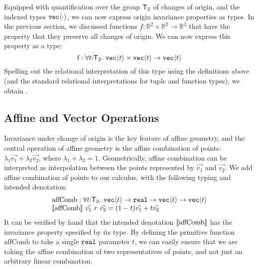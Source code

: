 Equipped with quantification over the group $\mathsf{T}_2$ of changes
of origin, and the indexed types $\texttt{vec}\langle \cdot \rangle$, we can now
express origin invariance properties as types. In the previous
section, we discussed functions $f : \mathbb{R}^2 \times \mathbb{R}^2
\to \mathbb{R}^2$ that have the property that they preserve all
changes of origin. We can now express this property as a type:
\begin{displaymath}
  \mathrm{f} : \forall t \mathord: \mathsf{T}_2.\ \texttt{vec}\langle t \rangle \times \texttt{vec}\langle t \rangle \to \texttt{vec}\langle t \rangle
\end{displaymath}
Spelling out the relational interpretation of this type using the
definitions above (and the standard relational interpretations for
tuple and function types), we obtain
.

\subsection{Affine and Vector Operations}
\label{sec:affine-vector-ops}

Invariance under change of origin is the key feature of affine
geometry, and the central operation of affine geometry is the affine
combination of points: $\lambda_1\vec{v_1} + \lambda_2\vec{v_2}$,
where $\lambda_1 + \lambda_2 = 1$. Geometrically, affine combination
can be interpreted as interpolation between the points represented by
$\vec{v_1}$ and $\vec{v_2}$. We add affine combination of points to
our calculus, with the following typing and intended denotation:
\begin{displaymath}
  \begin{array}{l}
    \mathrm{affComb} :\forall t \mathord: \mathsf{T}_2.\ \texttt{vec}\langle t \rangle \to \texttt{real} \to \texttt{vec}\langle t \rangle \to \texttt{vec}\langle t \rangle \\
    \llbracket \mathrm{affComb} \rrbracket\ \vec{v_1}\ r\ \vec{v_2} = (1-t)\vec{v_1} + t\vec{v_2}
  \end{array}
\end{displaymath}
It can be verified by hand that the intended denotation
$\llbracket \mathrm{affComb} \rrbracket$ has the invariance property specified by its
type.  By defining the primitive function $\mathrm{affComb}$ to take a
single $\texttt{real}$ parameter $t$, we can easily ensure that we
are taking the affine combination of two representatives of points,
and not just an arbitrary linear combination.

